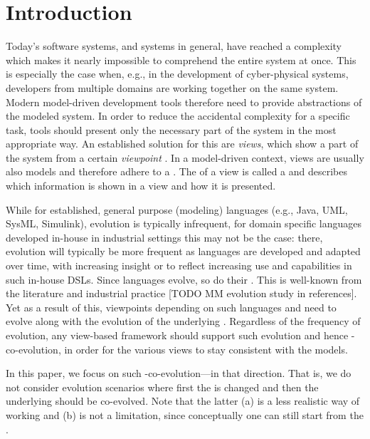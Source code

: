 \section{Introduction}
\label{sec:Introduction}

Today's software systems, and systems in general, have reached a complexity which makes it nearly impossible to comprehend the entire system at once.
This is especially the case when, e.g., in the development of cyber-physical systems, developers from multiple domains are working together on the same system.
Modern model-driven development tools therefore need to provide abstractions of the modeled system.
In order to reduce the accidental complexity for a specific task, tools should present only the necessary part of the system in the most appropriate way.
An established solution for this are \emph{views}, which show a part of the system from a certain \emph{viewpoint} \autocite{atkinson_orthographic_2010}.
In a model-driven context, views are usually also models and therefore adhere to a \metamodel.
The \metamodel of a view is called a \viewtype \autocite{goldschmidt_towards_2012} and describes which information is shown in a view and how it is presented.

While for established, general purpose (modeling) languages (e.g., Java, UML, SysML, Simulink), evolution is typically infrequent, for domain specific languages developed in-house in industrial settings this may not be the case: there, evolution will typically be more frequent as languages are developed and adapted over time, with increasing insight or to reflect increasing use and capabilities in such in-house DSLs. Since languages evolve, so do their \metamodels. This is well-known from the literature and industrial practice [TODO MM evolution study in references]. Yet as a result of this, viewpoints depending on such languages and \metamodels need to evolve along with the evolution of the underlying \metamodels. Regardless of the frequency of \metamodel evolution, any view-based framework should support such evolution and hence  \metamodel-\viewtype co-evolution, in order for the various views to stay consistent with the models. 

In this paper, we focus on such \metamodel-\viewtype co-evolution---in that direction. That is, we do not consider evolution scenarios where first the \viewtype is changed and then the underlying \metamodel should be co-evolved. Note that the latter (a) is a less realistic way of working and (b) is not a limitation, since conceptually one can still start from the \viewtype.

